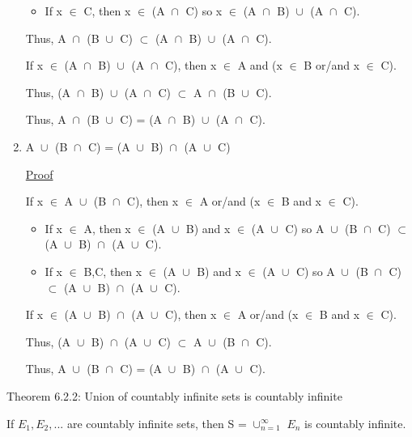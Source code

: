 \begin{enumerate}[label=(\alph*), leftmargin=2cm, itemsep=0.1cm]
\begin{itemize}[leftmargin=1cm, itemsep=0.1cm]
					\item If x $\in$ C, then x $\in$ (A $\cap_{}^{}$ C) so
						x $\in$ (A $\cap_{}^{}$ B) $\cup_{}^{}$ (A $\cap_{}^{}$ C).
				\end{itemize}
				Thus, A $\cap_{}^{}$ (B $\cup_{}^{}$ C)
				$\subset$ (A $\cap_{}^{}$ B) $\cup_{}^{}$ (A $\cap_{}^{}$ C).
				
				If x $\in$ (A $\cap_{}^{}$ B) $\cup_{}^{}$ (A $\cap_{}^{}$ C),
				then x $\in$ A and (x $\in$ B or/and x $\in$ C).

				Thus, (A $\cap_{}^{}$ B) $\cup_{}^{}$ (A $\cap_{}^{}$ C)
				$\subset$ A $\cap_{}^{}$ (B $\cup_{}^{}$ C).

				Thus, A $\cap_{}^{}$ (B $\cup_{}^{}$ C)
				= (A $\cap_{}^{}$ B) $\cup_{}^{}$ (A $\cap_{}^{}$ C).

		\item A $\cup_{}^{}$ (B $\cap_{}^{}$ C) = (A $\cup_{}^{}$ B) $\cap_{}^{}$ (A $\cup_{}^{}$ C)

			{ \color{magenta} \underline{Proof} } 
			
			If x $\in$ A $\cup_{}^{}$ (B $\cap_{}^{}$ C), then
			x $\in$ A or/and (x $\in$ B and x $\in$ C).
			\begin{itemize}[leftmargin=1cm, itemsep=0.1cm]
				\item If x $\in$ A, then x $\in$ (A $\cup_{}^{}$ B)
					and x $\in$ (A $\cup_{}^{}$ C)
					so A $\cup_{}^{}$ (B $\cap_{}^{}$ C) $\subset$
					(A $\cup_{}^{}$ B) $\cap_{}^{}$ (A $\cup_{}^{}$ C).

				\item If x $\in$ B,C, then x $\in$ (A $\cup_{}^{}$ B)
					and x $\in$ (A $\cup_{}^{}$ C)
					so A $\cup_{}^{}$ (B $\cap_{}^{}$ C) $\subset$
					(A $\cup_{}^{}$ B) $\cap_{}^{}$ (A $\cup_{}^{}$ C).
			\end{itemize}
			If x $\in$ (A $\cup_{}^{}$ B) $\cap_{}^{}$ (A $\cup_{}^{}$ C), then
			x $\in$ A or/and (x $\in$ B and x $\in$ C).

			Thus, (A $\cup_{}^{}$ B) $\cap_{}^{}$ (A $\cup_{}^{}$ C)
			$\subset$ A $\cup_{}^{}$ (B $\cap_{}^{}$ C).

			Thus, A $\cup_{}^{}$ (B $\cap_{}^{}$ C)
			= (A $\cup_{}^{}$ B) $\cap_{}^{}$ (A $\cup_{}^{}$ C). \\
	\end{enumerate}

{ \color{red} Theorem 6.2.2: Union of countably infinite sets is countably infinite } 

	\begin{adjustbox}{minipage=14cm, right, vspace=0.1cm 0cm}
		If $E_1, E_2, ... $ are countably infinite sets, then S = $\cup_{n=1}^{\infty}$ $E_n$
		is countably infinite.
	\end{adjustbox}

